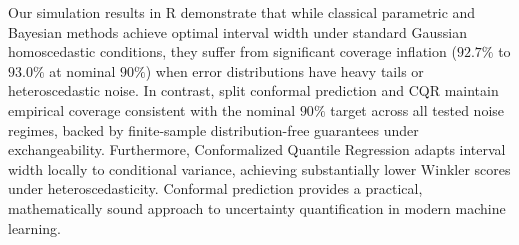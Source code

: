 \documentclass[journal]{IEEEtran}
\begin{document}
Our simulation results in R demonstrate that while classical parametric and Bayesian methods achieve optimal interval width under standard Gaussian homoscedastic conditions, they suffer from significant coverage inflation ($92.7\%$ to $93.0\%$ at nominal $90\%$) when error distributions have heavy tails or heteroscedastic noise. In contrast, split conformal prediction and CQR maintain empirical coverage consistent with the nominal $90\%$ target across all tested noise regimes, backed by finite-sample distribution-free guarantees under exchangeability. Furthermore, Conformalized Quantile Regression adapts interval width locally to conditional variance, achieving substantially lower Winkler scores under heteroscedasticity. Conformal prediction provides a practical, mathematically sound approach to uncertainty quantification in modern machine learning.



\end{document}
